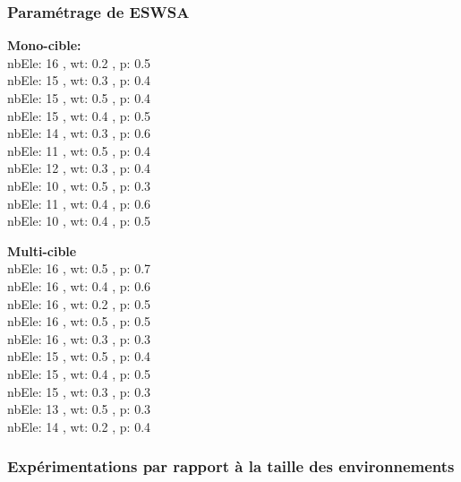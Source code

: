 \subsubsection{Paramétrage de ESWSA}
\noindent
\begin{minipage}[t]{0.55\textwidth}
	\textbf{Mono-cible:} \\
	nbEle: 16 , wt: 0.2 , p: 0.5\\
	nbEle: 15 , wt: 0.3 , p: 0.4\\
	nbEle: 15 , wt: 0.5 , p: 0.4\\
	nbEle: 15 , wt: 0.4 , p: 0.5\\
	nbEle: 14 , wt: 0.3 , p: 0.6\\
	nbEle: 11 , wt: 0.5 , p: 0.4\\
	nbEle: 12 , wt: 0.3 , p: 0.4\\
	nbEle: 10 , wt: 0.5 ,  p: 0.3\\
	nbEle: 11 , wt: 0.4 , p: 0.6\\
	nbEle: 10 , wt: 0.4 , p: 0.5\\
	
\end{minipage}\hfill
\hspace{0.2cm}
\begin{minipage}[t]{0.55\textwidth}
	\textbf{Multi-cible}\\
	nbEle: 16 , wt: 0.5 , p: 0.7\\
	nbEle: 16 , wt: 0.4 , p: 0.6\\
	nbEle: 16 , wt: 0.2 , p: 0.5\\
	nbEle: 16 , wt: 0.5 , p: 0.5\\
	nbEle: 16 , wt: 0.3 , p: 0.3\\
	nbEle: 15 , wt: 0.5 , p: 0.4\\
	nbEle: 15 , wt: 0.4 , p: 0.5\\
	nbEle: 15 , wt: 0.3 , p: 0.3\\
	nbEle: 13 , wt: 0.5 , p: 0.3\\
	nbEle: 14 , wt: 0.2 , p: 0.4\\
	
\end{minipage}\hfill


\subsubsection{Expérimentations par rapport à la taille des environnements}
